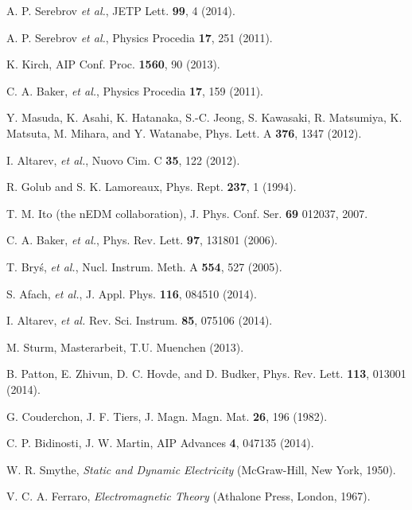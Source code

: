 \documentclass[review]{elsarticle}
\begin{document}

\begin{thebibliography}{00}

 A. P. Serebrov {\it et al.}, JETP Lett. {\bf 99}, 4
  (2014).

 A. P. Serebrov {\it et al.}, Physics Procedia {\bf
  17}, 251 (2011).

 K. Kirch, AIP Conf. Proc. {\bf 1560}, 90 (2013).

 C. A. Baker, {\it et al.}, Physics Procedia {\bf
  17}, 159 (2011).

 Y. Masuda, K. Asahi, K. Hatanaka, S.-C. Jeong,
  S. Kawasaki, R. Matsumiya, K. Matsuta, M. Mihara, and Y. Watanabe,
  Phys. Lett. A {\bf 376}, 1347 (2012).

 I. Altarev, {\it et al.}, Nuovo Cim. C {\bf
  35}, 122 (2012).

 R. Golub and S. K. Lamoreaux, Phys. Rept.  {\bf
  237}, 1 (1994).

 T. M. Ito (the nEDM collaboration),
  J. Phys. Conf. Ser. {\bf 69} 012037, 2007.

 C. A. Baker, {\it et al.}, Phys. Rev. Lett. {\bf
  97}, 131801 (2006).

 T. Bry\'s, {\it et al.}, Nucl. Instrum. Meth. A
  {\bf 554}, 527 (2005).

 S. Afach, {\it et al.}, J. Appl. Phys. {\bf 116},
  084510 (2014).

 I. Altarev, {\it et al.}
  Rev. Sci. Instrum. {\bf 85}, 075106 (2014).

 M. Sturm, Masterarbeit, T.U. Muenchen (2013).

 B. Patton, E. Zhivun, D. C. Hovde, and D. Budker,
  Phys. Rev. Lett. {\bf 113}, 013001 (2014).

 G. Couderchon, J. F. Tiers,
  J. Magn. Magn. Mat. {\bf 26}, 196 (1982).

 C. P. Bidinosti, J. W. Martin, AIP Advances
  {\bf 4}, 047135 (2014).

 W. R. Smythe, {\it Static and Dynamic
  Electricity} (McGraw-Hill, New York, 1950).

 V. C. A. Ferraro, {\it Electromagnetic Theory} (Athalone Press, London, 1967).


\end{thebibliography}
\end{document}
